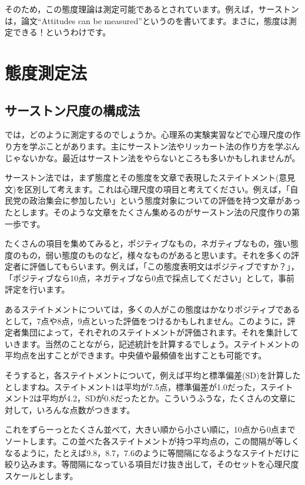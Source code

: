 \documentclass{ltjsbook}
\begin{document}
そのため，この態度理論は測定可能であるとされています。例えば，サーストンは，論文``Attitudes can be measured''というのを書いてます\parencite{ACBM}。まさに，態度は測定できる！というわけです。

\section{態度測定法}
\subsection{サーストン尺度の構成法}
では，どのように測定するのでしょうか。心理系の実験実習などで心理尺度の作り方を学ぶことがあります。主にサーストン法やリッカート法の作り方を学ぶんじゃないかな。最近はサーストン法をやらないところも多いかもしれませんが。

サーストン法では，まず態度とその態度を文章で表現したステイトメント(意見文)を区別して考えます。これは心理尺度の項目と考えてください。例えば，「自民党の政治集会に参加したい」という態度対象についての評価を持つ文章があったとします。そのような文章をたくさん集めるのがサーストン法の尺度作りの第一歩です。

たくさんの項目を集めてみると，ポジティブなもの，ネガティブなもの，強い態度のもの，弱い態度のものなど，様々なものがあると思います。それを多くの評定者に評価してもらいます。例えば，「この態度表明文はポジティブですか？」，「ポジティブなら10点，ネガティブなら0点で採点してください」として，事前評定を行います。

あるステイトメントについては，多くの人がこの態度はかなりポジティブであるとして，7点や8点，9点といった評価をつけるかもしれません。このように，評定者集団によって，それぞれのステイトメントが評価されます。それを集計していきます。当然のことながら，記述統計を計算するでしょう。ステイトメントの平均点を出すことができます。中央値や最頻値を出すことも可能です。

そうすると，各ステイトメントについて，例えば平均と標準偏差(SD)を計算したとしますね。ステイトメント1は平均が7.5点，標準偏差が1.0だった，ステイトメント2は平均が4.2，SDが0.8だったとか。こういうふうな，たくさんの文章に対して，いろんな点数がつきます。

これをずらーっとたくさん並べて，大きい順から小さい順に，10点から0点までソートします。この並べた各ステイトメントが持つ平均点の，この間隔が等しくなるように，たとえば9.8，8.7，7.6のように等間隔になるようなステイトだけに絞り込みます。等間隔になっている項目だけ抜き出して，そのセットを心理尺度スケールとします。
\end{document}
